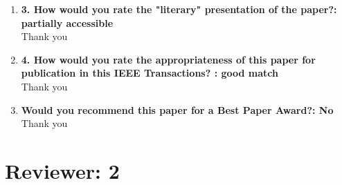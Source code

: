 \documentclass[11pt]{article}
\begin{document}
\begin{enumerate}
\item\textbf{3. How would you rate the "literary" presentation of the paper?: partially accessible
}\\
Thank you

\item\textbf{4. How would you rate the appropriateness of this paper for publication in this IEEE Transactions? : good match}\\
Thank you

\item\textbf{Would you recommend this paper for a Best Paper Award?: No}\\
Thank you

\end{enumerate}

\section*{Reviewer: 2}
\end{document}
